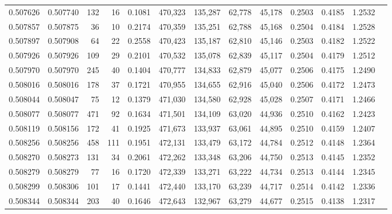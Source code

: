 \begin{tabular}{rrrrrrrrrrrrr}
0.507626 & 0.507740 &   132 &    16 &                                     0.1081 & 470,323 & 135,287 &  62,778 &  45,178 & 0.2503 & 0.4185 & 1.2532 \\
0.507857 & 0.507875 &    36 &    10 &                                     0.2174 & 470,359 & 135,251 &  62,788 &  45,168 & 0.2504 & 0.4184 & 1.2528 \\
0.507897 & 0.507908 &    64 &    22 &                                     0.2558 & 470,423 & 135,187 &  62,810 &  45,146 & 0.2503 & 0.4182 & 1.2522 \\
0.507926 & 0.507926 &   109 &    29 &                                     0.2101 & 470,532 & 135,078 &  62,839 &  45,117 & 0.2504 & 0.4179 & 1.2512 \\
0.507970 & 0.507970 &   245 &    40 &                                     0.1404 & 470,777 & 134,833 &  62,879 &  45,077 & 0.2506 & 0.4175 & 1.2490 \\
0.508016 & 0.508016 &   178 &    37 &                                     0.1721 & 470,955 & 134,655 &  62,916 &  45,040 & 0.2506 & 0.4172 & 1.2473 \\
0.508044 & 0.508047 &    75 &    12 &                                     0.1379 & 471,030 & 134,580 &  62,928 &  45,028 & 0.2507 & 0.4171 & 1.2466 \\
0.508077 & 0.508077 &   471 &    92 &                                     0.1634 & 471,501 & 134,109 &  63,020 &  44,936 & 0.2510 & 0.4162 & 1.2423 \\
0.508119 & 0.508156 &   172 &    41 &                                     0.1925 & 471,673 & 133,937 &  63,061 &  44,895 & 0.2510 & 0.4159 & 1.2407 \\
0.508256 & 0.508256 &   458 &   111 &                                     0.1951 & 472,131 & 133,479 &  63,172 &  44,784 & 0.2512 & 0.4148 & 1.2364 \\
0.508270 & 0.508273 &   131 &    34 &                                     0.2061 & 472,262 & 133,348 &  63,206 &  44,750 & 0.2513 & 0.4145 & 1.2352 \\
0.508279 & 0.508279 &    77 &    16 &                                     0.1720 & 472,339 & 133,271 &  63,222 &  44,734 & 0.2513 & 0.4144 & 1.2345 \\
0.508299 & 0.508306 &   101 &    17 &                                     0.1441 & 472,440 & 133,170 &  63,239 &  44,717 & 0.2514 & 0.4142 & 1.2336 \\
0.508344 & 0.508344 &   203 &    40 &                                     0.1646 & 472,643 & 132,967 &  63,279 &  44,677 & 0.2515 & 0.4138 & 1.2317 \\

\end{tabular}
